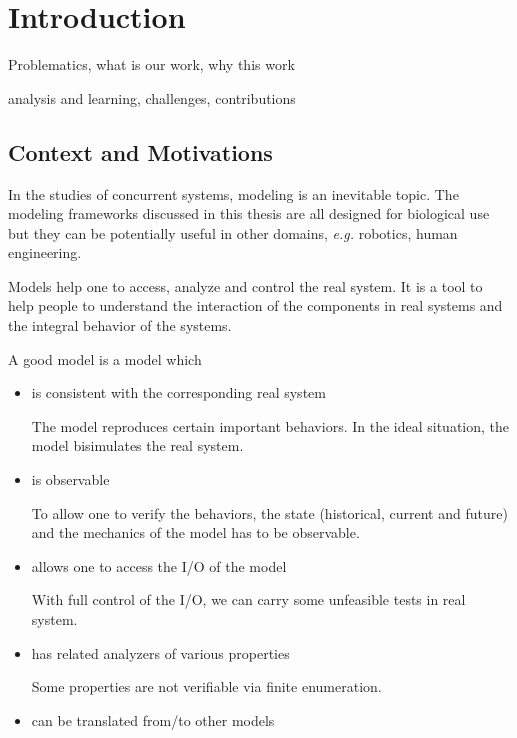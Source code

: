 \chapter{Introduction}\label{chap:intro}
\begin{mybox}
Problematics, what is our work, why this work

analysis and learning, challenges, contributions
\end{mybox}

\section{Context and Motivations}
In the studies of concurrent systems, modeling is an inevitable topic.
The modeling frameworks discussed in this thesis are all designed for biological use but they can be potentially useful in other domains, \textit{e.g.} robotics, human engineering.

Models help one to access, analyze and control the real system. 
It is a tool to help people to understand the interaction of the components in real systems and the integral behavior of the systems.

A good model is a model which

\begin{itemize}
    \item is consistent with the corresponding real system
    
    The model reproduces certain important behaviors.
    In the ideal situation, the model bisimulates the real system.
    \item is observable
    
    To allow one to verify the behaviors, the state (historical, current and future) and the mechanics of the model has to be observable.
    
    \item allows one to access the I/O of the model
    
    With full control of the I/O, we can carry some unfeasible tests in real system.
    \item has related analyzers of various properties
    
    Some properties are not verifiable via finite enumeration.
    \item can be translated from/to other models 
\end{itemize}

